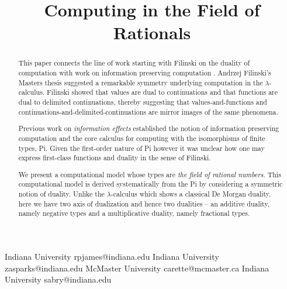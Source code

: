\documentclass[preprint]{sigplanconf}
\newcommand{\lcal}{\ensuremath{\lambda}-calculus\xspace}
\begin{document}
\CopyrightYear{}
\copyrightdata{}
\titlebanner{}
\preprintfooter{}

\title{Computing in the Field of Rationals}

           {Indiana University}
           {rpjames@indiana.edu}
           {Indiana University}
           {zasparks@indiana.edu}
           {McMaster University}
           {carette@mcmaster.ca}
           {Indiana University}
           {sabry@indiana.edu}

\maketitle

\begin{abstract}

  This paper connects the line of work starting with
  Filinski\cite{Filinski:1989:DCI:648332.755574} on the duality of
  computation \cite{Curien:2000,DBLP:conf/rta/Wadler05} with work on
  information preserving computation \cite{infeffects,rc2011}.
  Andrzej Filinski's Masters thesis
  \cite{Filinski:1989:DCI:648332.755574} suggested a remarkable
  symmetry underlying computation in the \lcal. Filinski showed that
  values are dual to continuations and that functions are dual to
  delimited continuations, thereby suggesting that
  values-and-functions and continuations-and-delimited-continuations
  are mirror images of the same phenomena.

  Previous work on \emph{information effects} established the notion
  of information preserving computation \cite{infeffects} and the core
  calculus for computing with the isomorphisms of finite types,
  {{Pi}}. Given the first-order nature of {{Pi}} however it was
  unclear how one may express first-class functions and duality in the
  sense of Filinski.

  We present a computational model whose types are \emph{the field of
    rational numbers}. This computational model is derived
  systematically from the {{Pi}} by considering a symmetric notion of
  duality. Unlike the \lcal which shows a classical De Morgan duality,
  here we have two axis of dualization and hence two dualities -- an
  additive duality, namely negative types and a multiplicative
  duality, namely fractional types.


\end{abstract}
\end{document}
